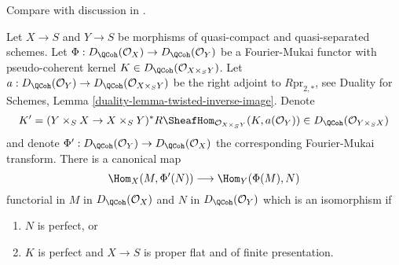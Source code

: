 \begin{lemma}
\label{lemma-fourier-mukai-right-adjoint}
\begin{reference}
Compare with discussion in \cite{Rizzardo}.
\end{reference}
Let $X \to S$ and $Y \to S$ be morphisms of quasi-compact and quasi-separated
schemes. Let $\Phi : D_\QCoh(\mathcal{O}_X) \to D_\QCoh(\mathcal{O}_Y)$
be a Fourier-Mukai functor with pseudo-coherent kernel
$K \in D_\QCoh(\mathcal{O}_{X \times_S Y})$.
Let $a : D_\QCoh(\mathcal{O}_Y) \to  D_\QCoh(\mathcal{O}_{X \times_S Y})$
be the right adjoint to $R\text{pr}_{2, *}$, see
Duality for Schemes, Lemma \ref{duality-lemma-twisted-inverse-image}.
Denote
$$
K' = (Y \times_S X \to X \times_S Y)^*
R\SheafHom_{\mathcal{O}_{X \times_S Y}}(K, a(\mathcal{O}_Y)) \in
D_\QCoh(\mathcal{O}_{Y \times_S X})
$$
and denote $\Phi' : D_\QCoh(\mathcal{O}_Y) \to D_\QCoh(\mathcal{O}_X)$
the corresponding Fourier-Mukai transform. There is a canonical map
$$
\Hom_X(M, \Phi'(N)) \longrightarrow \Hom_Y(\Phi(M), N)
$$
functorial in $M$ in $D_\QCoh(\mathcal{O}_X)$ and $N$ in
$D_\QCoh(\mathcal{O}_Y)$ which is an isomorphism if
\begin{enumerate}
\item $N$ is perfect, or
\item $K$ is perfect and $X \to S$ is proper flat and of finite presentation.
\end{enumerate}
\end{lemma}

